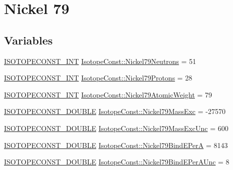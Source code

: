 \hypertarget{group___isotope_const-_nickel-_ni79}{}\section{Nickel 79}
\label{group___isotope_const-_nickel-_ni79}
\subsection*{Variables}
\begin{DoxyCompactItemize}
\item 
\mbox{\hyperlink{group___isotope_const-_macros_ga5f18360b3e99483a35c32d789e62621c}{I\+S\+O\+T\+O\+P\+E\+C\+O\+N\+S\+T\+\_\+\+I\+NT}} \mbox{\hyperlink{group___isotope_const-_nickel-_ni79_ga08a7a2b9b533fa54c5caa9d6f9aac6a9}{Isotope\+Const\+::\+Nickel79\+Neutrons}} = 51
\item 
\mbox{\hyperlink{group___isotope_const-_macros_ga5f18360b3e99483a35c32d789e62621c}{I\+S\+O\+T\+O\+P\+E\+C\+O\+N\+S\+T\+\_\+\+I\+NT}} \mbox{\hyperlink{group___isotope_const-_nickel-_ni79_ga3c2b76fcb18fcd03ce7b18383c561209}{Isotope\+Const\+::\+Nickel79\+Protons}} = 28
\item 
\mbox{\hyperlink{group___isotope_const-_macros_ga5f18360b3e99483a35c32d789e62621c}{I\+S\+O\+T\+O\+P\+E\+C\+O\+N\+S\+T\+\_\+\+I\+NT}} \mbox{\hyperlink{group___isotope_const-_nickel-_ni79_gaffd59009a8bb9635a787a54baf43958c}{Isotope\+Const\+::\+Nickel79\+Atomic\+Weight}} = 79
\item 
\mbox{\hyperlink{group___isotope_const-_macros_ga8f45a7272ce02c0b4c65c44636ed719a}{I\+S\+O\+T\+O\+P\+E\+C\+O\+N\+S\+T\+\_\+\+D\+O\+U\+B\+LE}} \mbox{\hyperlink{group___isotope_const-_nickel-_ni79_ga689573b580f13597da714f3695cffd9c}{Isotope\+Const\+::\+Nickel79\+Mass\+Exc}} = -\/27570
\item 
\mbox{\hyperlink{group___isotope_const-_macros_ga8f45a7272ce02c0b4c65c44636ed719a}{I\+S\+O\+T\+O\+P\+E\+C\+O\+N\+S\+T\+\_\+\+D\+O\+U\+B\+LE}} \mbox{\hyperlink{group___isotope_const-_nickel-_ni79_ga72756fa7e96f1d1b6a4fae06a1accbfb}{Isotope\+Const\+::\+Nickel79\+Mass\+Exc\+Unc}} = 600
\item 
\mbox{\hyperlink{group___isotope_const-_macros_ga8f45a7272ce02c0b4c65c44636ed719a}{I\+S\+O\+T\+O\+P\+E\+C\+O\+N\+S\+T\+\_\+\+D\+O\+U\+B\+LE}} \mbox{\hyperlink{group___isotope_const-_nickel-_ni79_ga575853454203d18cdf8e26c928d7b518}{Isotope\+Const\+::\+Nickel79\+Bind\+E\+PerA}} = 8143
\item 
\mbox{\hyperlink{group___isotope_const-_macros_ga8f45a7272ce02c0b4c65c44636ed719a}{I\+S\+O\+T\+O\+P\+E\+C\+O\+N\+S\+T\+\_\+\+D\+O\+U\+B\+LE}} \mbox{\hyperlink{group___isotope_const-_nickel-_ni79_gacf23eacd400ea68a9024de42a3689615}{Isotope\+Const\+::\+Nickel79\+Bind\+E\+Per\+A\+Unc}} = 8

\end{DoxyCompactItemize}
